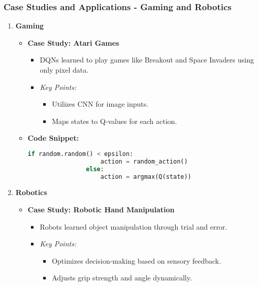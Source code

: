 \documentclass{beamer}
\begin{document}
\begin{frame}
    \frametitle{Case Studies and Applications - Gaming and Robotics}
    \begin{enumerate}
        \item \textbf{Gaming}
            \begin{itemize}
                \item \textbf{Case Study: Atari Games}
                \begin{itemize}
                    \item DQNs learned to play games like Breakout and Space Invaders using only pixel data.
                    \item \textit{Key Points:}
                    \begin{itemize}
                        \item Utilizes CNN for image inputs.
                        \item Maps states to Q-values for each action.
                    \end{itemize}
                \end{itemize}
                \item \textbf{Code Snippet:}
                \begin{lstlisting}[language=Python]
                if random.random() < epsilon:
                    action = random_action()
                else:
                    action = argmax(Q(state))
                \end{lstlisting}
            \end{itemize}
        
        \item \textbf{Robotics}
            \begin{itemize}
                \item \textbf{Case Study: Robotic Hand Manipulation}
                \begin{itemize}
                    \item Robots learned object manipulation through trial and error.
                    \item \textit{Key Points:}
                    \begin{itemize}
                        \item Optimizes decision-making based on sensory feedback.
                        \item Adjusts grip strength and angle dynamically.
                    \end{itemize}
                \end{itemize}
            \end{itemize}
    \end{enumerate}
\end{frame}
\end{document}
